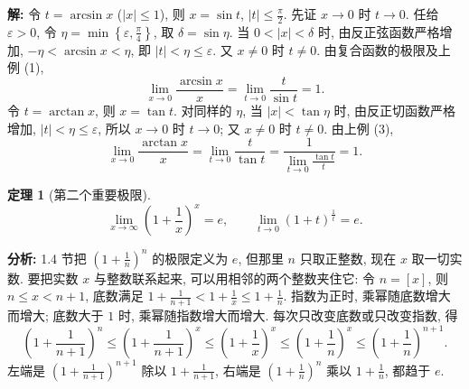 \documentclass[UTF8,openany]{ctexbook}
\theoremstyle{chinesetextbook}
\newtheorem{theorem}{定理}[section]
\newenvironment{cnsolution}{\par\indent\textbf{解:} \ignorespaces}{\par}
\begin{document}
\begin{cnsolution}
令 $t=\arcsin x$ ($|x|\le1$), 则 $x=\sin t$, $\displaystyle|t|\le\frac\pi2$. 先证 $x\to0$ 时 $t\to0$. 任给 $\varepsilon>0$, 令 $\displaystyle\eta=\min\left\{\varepsilon,\frac\pi4\right\}$, 取 $\delta=\sin\eta$. 当 $0<|x|<\delta$ 时, 由反正弦函数严格增加, $-\eta<\arcsin x<\eta$, 即 $|t|<\eta\le\varepsilon$. 又 $x\ne0$ 时 $t\ne0$. 由复合函数的极限及上例 (1),
\[
\lim_{x\to0}\frac{\arcsin x}x=\lim_{t\to0}\frac t{\sin t}=1.
\]
令 $t=\arctan x$, 则 $x=\tan t$. 对同样的 $\eta$, 当 $|x|<\tan\eta$ 时, 由反正切函数严格增加, $|t|<\eta\le\varepsilon$, 所以 $x\to0$ 时 $t\to0$; 又 $x\ne0$ 时 $t\ne0$. 由上例 (3),
\[
\lim_{x\to0}\frac{\arctan x}x=\lim_{t\to0}\frac t{\tan t}=\frac1{\displaystyle\lim_{t\to0}\frac{\tan t}t}=1.
\]
\end{cnsolution}
\begin{theorem}[第二个重要极限]
\[
\lim_{x\to\infty}\left(1+\frac1x\right)^x=e,\qquad\lim_{t\to0}(1+t)^{\frac1t}=e.
\]
\end{theorem}
\par\indent\textbf{分析:} 1.4 节把 $\displaystyle\left(1+\frac1n\right)^n$ 的极限定义为 $e$, 但那里 $n$ 只取正整数, 现在 $x$ 取一切实数. 要把实数 $x$ 与整数联系起来, 可以用相邻的两个整数夹住它: 令 $n=[x]$, 则 $n\le x<n+1$, 底数满足 $\displaystyle1+\frac1{n+1}<1+\frac1x\le1+\frac1n$. 指数为正时, 乘幂随底数增大而增大; 底数大于 $1$ 时, 乘幂随指数增大而增大. 每次只改变底数或只改变指数, 得
\[
\left(1+\frac1{n+1}\right)^n\le\left(1+\frac1{n+1}\right)^x\le\left(1+\frac1x\right)^x\le\left(1+\frac1n\right)^x\le\left(1+\frac1n\right)^{n+1}.
\]
左端是 $\displaystyle\left(1+\frac1{n+1}\right)^{n+1}$ 除以 $\displaystyle1+\frac1{n+1}$, 右端是 $\displaystyle\left(1+\frac1n\right)^n$ 乘以 $\displaystyle1+\frac1n$, 都趋于 $e$.
\end{document}

